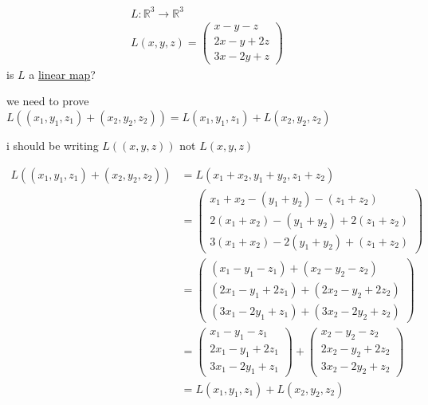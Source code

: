 \documentclass[a4paper,12pt]{article}
\begin{document}
\begin{definition}
\begin{question}
\begin{gather*}
  L: \mathbb{R}^3 \to \mathbb{R}^3\\
  L(x,y,z) = \begin{pmatrix}
                x-y-z\\
                2x-y+2z\\
                3x-2y+z
              \end{pmatrix}
\end{gather*}
is \(L\) a \hyperref[sec:orgdf3d063]{linear map}?\\
\begin{answer}
\begin{step}
we need to prove \(L((x_1,y_1,z_1)+(x_2,y_2,z_2)) = L(x_1,y_1,z_1) + L(x_2,y_2,z_2)\)\\
\begin{note}
i should be writing \(L((x,y,z))\) not \(L(x,y,z)\)\\
\end{note}
\begin{align*}
  L((x_1,y_1,z_1)+(x_2,y_2,z_2)) & = L(x_1+x_2,y_1+y_2,z_1+z_2)\\
  &= \begin{pmatrix}
       x_1+x_2-(y_1+y_2)-(z_1+z_2)\\
       2(x_1+x_2)-(y_1+y_2)+2(z_1+z_2)\\
       3(x_1+x_2)-2(y_1+y_2)+(z_1+z_2)
     \end{pmatrix}\\
  &= \begin{pmatrix}
       (x_1-y_1-z_1)+(x_2-y_2-z_2)\\
       (2x_1-y_1+2z_1)+(2x_2-y_2+2z_2)\\
       (3x_1-2y_1+z_1)+(3x_2-2y_2+z_2)
     \end{pmatrix}\\
  &= \begin{pmatrix}
       x_1-y_1-z_1\\
       2x_1-y_1+2z_1\\
       3x_1-2y_1+z_1
     \end{pmatrix} +
     \begin{pmatrix}
       x_2-y_2-z_2\\
       2x_2-y_2+2z_2\\
       3x_2-2y_2+z_2
     \end{pmatrix}\\
  &= L(x_1,y_1,z_1) + L(x_2,y_2,z_2)
\end{align*}

\end{step}
\end{answer}
\end{question}
\end{definition}
\end{document}
